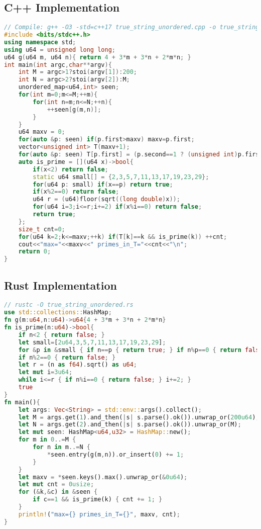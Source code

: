 \documentclass[12pt]{article}
\theoremstyle{definition}
\theoremstyle{plain}
\begin{document}
\subsection{C++ Implementation}
\begin{lstlisting}[language=C++]
// Compile: g++ -O3 -std=c++17 true_string_unordered.cpp -o true_string_unordered
#include <bits/stdc++.h>
using namespace std;
using u64 = unsigned long long;
u64 g(u64 m, u64 n){ return 4 + 3*m + 3*n + 2*m*n; }
int main(int argc,char**argv){
    int M = argc>1?stoi(argv[1]):200;
    int N = argc>2?stoi(argv[2]):M;
    unordered_map<u64,int> seen;
    for(int m=0;m<=M;++m){
        for(int n=m;n<=N;++n){
            ++seen[g(m,n)];
        }
    }
    u64 maxv = 0;
    for(auto &p: seen) if(p.first>maxv) maxv=p.first;
    vector<unsigned int> T(maxv+1);
    for(auto &p: seen) T[p.first] = (p.second==1 ? (unsigned int)p.first : 0);
    auto is_prime = [](u64 x)->bool{
        if(x<2) return false;
        static u64 small[] = {2,3,5,7,11,13,17,19,23,29};
        for(u64 p: small) if(x==p) return true;
        if(x%2==0) return false;
        u64 r = (u64)floor(sqrt((long double)x));
        for(u64 i=3;i<=r;i+=2) if(x%i==0) return false;
        return true;
    };
    size_t cnt=0;
    for(u64 k=2;k<=maxv;++k) if(T[k]==k && is_prime(k)) ++cnt;
    cout<<"max="<<maxv<<" primes_in_T="<<cnt<<"\n";
    return 0;
}
\end{lstlisting}

\subsection{Rust Implementation}
\begin{lstlisting}[language=Rust]
// rustc -O true_string_unordered.rs
use std::collections::HashMap;
fn g(m:u64,n:u64)->u64{4 + 3*m + 3*n + 2*m*n}
fn is_prime(n:u64)->bool{
    if n<2 { return false; }
    let small=[2u64,3,5,7,11,13,17,19,23,29];
    for &p in &small { if n==p { return true; } if n%p==0 { return false; } }
    if n%2==0 { return false; }
    let r = (n as f64).sqrt() as u64;
    let mut i=3u64;
    while i<=r { if n%i==0 { return false; } i+=2; }
    true
}
fn main(){
    let args: Vec<String> = std::env::args().collect();
    let M = args.get(1).and_then(|s| s.parse().ok()).unwrap_or(200u64);
    let N = args.get(2).and_then(|s| s.parse().ok()).unwrap_or(M);
    let mut seen: HashMap<u64,u32> = HashMap::new();
    for m in 0..=M {
        for n in m..=N {
            *seen.entry(g(m,n)).or_insert(0) += 1;
        }
    }
    let maxv = *seen.keys().max().unwrap_or(&0u64);
    let mut cnt = 0usize;
    for (&k,&c) in &seen {
        if c==1 && is_prime(k) { cnt += 1; }
    }
    println!("max={} primes_in_T={}", maxv, cnt);
}
\end{lstlisting}
\end{document}
